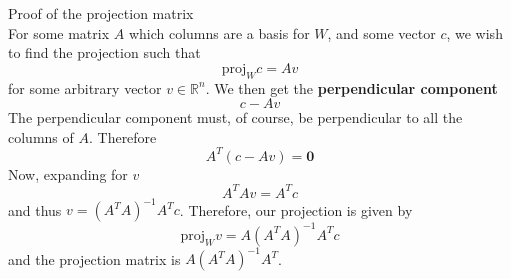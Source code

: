 \documentclass[journal, letterpaper]{IEEEtran}
\begin{document}
    \begin{myboxg}{Proof of the projection matrix} \\
        For some matrix $A$ which columns are a basis for $W$, and some vector $c$, we wish to find the projection 
        such that
        $$ \text{proj}_Wc = Av$$
        for some arbitrary vector $v \in \mathbb{R}^n$. We then get the \textbf{perpendicular component}
        $$ c - Av$$
        The perpendicular component must, of course, be perpendicular to all the columns of $A$. Therefore
        $$ A^T(c - Av) = \mathbf{0}$$
        Now, expanding for $v$
        $$ A^TAv = A^Tc$$
        and thus $v = (A^TA)^{-1}A^Tc$. Therefore, our projection is given by
        $$ \text{proj}_Wv = A(A^TA)^{-1}A^Tc$$
        and the projection matrix is $A(A^TA)^{-1}A^T$.
    \end{myboxg}
\end{document}
